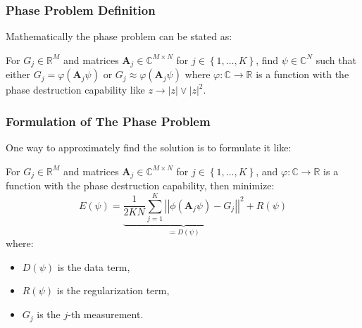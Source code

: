 \begin{frame}
    \frametitle{Phase Problem Definition}
  \pause
  Mathematically the phase problem can be stated as:
  \pause
  \begin{Pro}\label{pro:phase_problem} For $G_j \in \mathbb{R}^M$ and matrices 
    $\boldsymbol{A}_j \in \mathbb{C}^{M \times N}$ for $j \in \left\{1,\ldots,K\right\}$, find 
  $\psi \in \mathbb{C}^N$ such that either $G_j = \varphi(\boldsymbol{A}_j\psi)$ or $G_j \approx \varphi(\boldsymbol{A}_j\psi)$ where 
  $\varphi \colon \mathbb{C} \to \mathbb{R}$ is a function with the phase destruction 
  capability like $z \rightarrow \left|z\right| \lor {\left|z\right|^2}$. 
  \end{Pro}
\end{frame}
\begin{frame}
    \frametitle{Formulation of The Phase Problem}
    \pause
    One way to approximately find the solution is to formulate it like:
    \pause
    \begin{Pro}\label{pro:phase_retrieval_problem} For $G_j \in \mathbb{R}^M$ and matrices 
        $\boldsymbol{A}_j \in \mathbb{C}^{M \times N}$ for $j \in \left\{1,\ldots,K\right\}$, and 
        $\varphi \colon \mathbb{C} \to \mathbb{R}$ is a function with the phase destruction capability, then minimize:
        \begin{equation}\label{eq:phase_retrieval_problem}
        E(\psi) = \underbrace{\frac{1}{2KN} \sum_{j=1}^{K} {\left|\left|\phi(\boldsymbol{A}_j\psi)-G_j\right|\right|}^2}_{\coloneqq D(\psi)}+ R(\psi)
        \end{equation}
        where:
        \begin{itemize}
        \item $D(\psi)$ is the data term,
        \item $R(\psi)$ is the regularization term,
        \item $G_j$ is the $j$-th measurement.
        \end{itemize}
    \end{Pro}
\end{frame}


